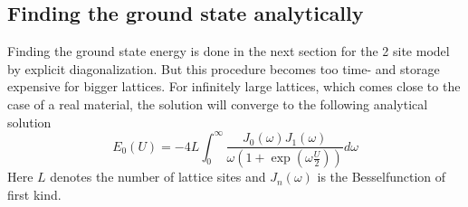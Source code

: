 \subsection{Finding the ground state analytically}
Finding the ground state energy is done in the next section for the 2 site model by explicit diagonalization. But this procedure becomes too time- and storage expensive for bigger lattices. For infinitely large lattices, which comes close to the case of a real material, the solution will converge to the following analytical solution
\begin{equation}\label{analytisch}
E_0(U)=-4L\int_{0}^{\infty}\frac{J_0(\omega)J_1(\omega)}{\omega\left( 1+\exp\left( \omega\frac{U}{2}\right) \right) }d\omega
\end{equation}\cite{Monien}
Here $ L $ denotes the number of lattice sites and $ J_n(\omega) $ is the Besselfunction of first kind.
















